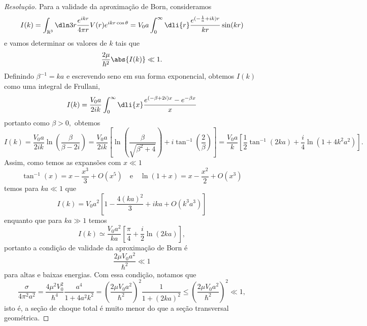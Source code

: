 \begin{proof}[Resolução]
   Para a validade da aproximação de Born, consideramos 
   \begin{equation*}
      I(k) = \int_{\mathbb{R}^3} \dln3r \frac{e^{ikr}}{4\pi r} V(r) e^{ikr\cos\theta} = V_0 a \int_{0}^\infty \dli{r} \frac{e^{(-\frac{1}{a} + ik)r}}{kr} \sin(kr)
   \end{equation*}
   e vamos determinar os valores de \(k\) tais que
   \begin{equation*}
      \frac{2\mu}{\hbar^2}\abs{I(k)} \ll 1.
   \end{equation*}
   Definindo \(\beta^{-1} = ka\) e escrevendo seno em sua forma exponencial, obtemos \(I(k)\) como uma integral de Frullani,
   \begin{equation*}
      I(k) = \frac{V_0a}{2ik} \int_0^\infty \dli{x} \frac{e^{(-\beta + 2i)x} - e^{-\beta x}}{x}
   \end{equation*}
   portanto como \(\beta > 0,\) obtemos
   \begin{equation*}
      I(k) = \frac{V_0 a}{2ik} \ln\left(\frac{\beta}{\beta - 2i}\right) = \frac{V_0 a}{2ik}\left[ \ln\left(\frac{\beta}{\sqrt{\beta^2 + 4}}\right) + i \tan^{-1}\left(\frac{2}{\beta}\right)\right] =  \frac{V_0 a}{k} \left[\frac12 \tan^{-1}\left(2ka\right) + \frac{i}{4}\ln\left(1 + 4k^2 a^2\right)\right].
   \end{equation*}
   Assim, como temos as expansões com \(x \ll 1\)
   \begin{equation*}
      \tan^{-1}(x) = x - \frac{x^3}{3} + O(x^5)\quad\text{e}\quad
      \ln(1 + x) = x - \frac{x^2}{2}+ O(x^3)
   \end{equation*}
   temos para \(ka \ll 1\) que
   \begin{equation*}
      I(k) = V_0 a^2\left[1 - \frac{4(ka)^2}{3} + i ka + O(k^3a^3)\right]
   \end{equation*}
   enquanto que para \(ka \gg 1\) temos
   \begin{equation*}
      I(k) \simeq \frac{V_0 a^2}{ka} \left[\frac{\pi}{4} + \frac{i}{2} \ln\left(2ka\right)\right],
   \end{equation*}
   portanto a condição de validade da aproximação de Born é 
   \begin{equation*}
      \frac{2\mu V_0 a^2}{\hbar^2} \ll 1
   \end{equation*}
   para altas e baixas energias. Com essa condição, notamos que
   \begin{equation*}
      \frac{\sigma}{4\pi^2 a^2} = \frac{4 \mu^2 V_0^2}{\hbar^4} \frac{a^4}{1 + 4a^2 k^2} = \left(\frac{2\mu V_0 a^2}{\hbar^2}\right)^2 \frac{1}{1 + (2ka)^2} \leq \left(\frac{2\mu V_0 a^2}{\hbar^2}\right)^2 \ll 1,
   \end{equation*}
   isto é, a seção de choque total é muito menor do que a seção transversal geométrica.
\end{proof}

